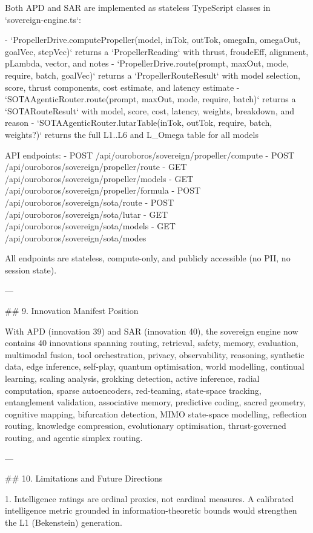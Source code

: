 Both APD and SAR are implemented as stateless TypeScript classes in `sovereign-engine.ts`:

- `PropellerDrive.computePropeller(model, inTok, outTok, omegaIn, omegaOut, goalVec, stepVec)` returns a `PropellerReading` with thrust, froudeEff, alignment, pLambda, vector, and notes
- `PropellerDrive.route(prompt, maxOut, mode, require, batch, goalVec)` returns a `PropellerRouteResult` with model selection, score, thrust components, cost estimate, and latency estimate
- `SOTAAgenticRouter.route(prompt, maxOut, mode, require, batch)` returns a `SOTARouteResult` with model, score, cost, latency, weights, breakdown, and reason
- `SOTAAgenticRouter.lutarTable(inTok, outTok, require, batch, weights?)` returns the full L1..L6 and L_Omega table for all models

API endpoints:
- POST /api/ouroboros/sovereign/propeller/compute
- POST /api/ouroboros/sovereign/propeller/route
- GET /api/ouroboros/sovereign/propeller/models
- GET /api/ouroboros/sovereign/propeller/formula
- POST /api/ouroboros/sovereign/sota/route
- POST /api/ouroboros/sovereign/sota/lutar
- GET /api/ouroboros/sovereign/sota/models
- GET /api/ouroboros/sovereign/sota/modes

All endpoints are stateless, compute-only, and publicly accessible (no PII, no session state).

---

## 9. Innovation Manifest Position

With APD (innovation 39) and SAR (innovation 40), the sovereign engine now contains 40 innovations spanning routing, retrieval, safety, memory, evaluation, multimodal fusion, tool orchestration, privacy, observability, reasoning, synthetic data, edge inference, self-play, quantum optimisation, world modelling, continual learning, scaling analysis, grokking detection, active inference, radial computation, sparse autoencoders, red-teaming, state-space tracking, entanglement validation, associative memory, predictive coding, sacred geometry, cognitive mapping, bifurcation detection, MIMO state-space modelling, reflection routing, knowledge compression, evolutionary optimisation, thrust-governed routing, and agentic simplex routing.

---

## 10. Limitations and Future Directions

1. Intelligence ratings are ordinal proxies, not cardinal measures. A calibrated intelligence metric grounded in information-theoretic bounds would strengthen the L1 (Bekenstein) generation.


